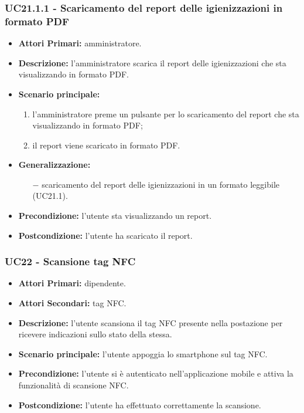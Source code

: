 \subsubsection{ UC21.1.1 - Scaricamento del report delle igienizzazioni in formato PDF}
\begin{itemize}
	\item\textbf{Attori Primari:} 
	amministratore.
	\item\textbf{Descrizione:} 
	l'amministratore scarica il report delle igienizzazioni che sta visualizzando in formato PDF.
	\item\textbf{Scenario principale:} 
	\begin{enumerate}
		\item l'amministratore preme un pulsante per lo scaricamento del report che sta visualizzando in formato PDF;
		\item il report viene scaricato in formato PDF.
	\end{enumerate}
	\item\textbf{Generalizzazione:}
	\begin{itemize}
		\item[$-$] scaricamento del report delle igienizzazioni in un formato leggibile (UC21.1).
	\end{itemize}
	\item\textbf{Precondizione:} 
	l'utente sta visualizzando un report.
	\item\textbf{Postcondizione:}
	l'utente ha scaricato il report.
\end{itemize}



\subsubsection{ UC22 - Scansione tag NFC}
\begin{itemize}
	\item\textbf{Attori Primari:} dipendente.
	\item\textbf{Attori Secondari:} tag NFC.
	\item\textbf{Descrizione:} l’utente scansiona il tag NFC presente nella postazione per ricevere indicazioni sullo stato della stessa.
	\item\textbf{Scenario principale:} l’utente appoggia lo smartphone sul tag NFC.
	\item\textbf{Precondizione:} l’utente si è autenticato nell'applicazione mobile e attiva la funzionalità di scansione NFC.
	\item\textbf{Postcondizione:} l’utente ha effettuato correttamente la scansione.
\end{itemize}

